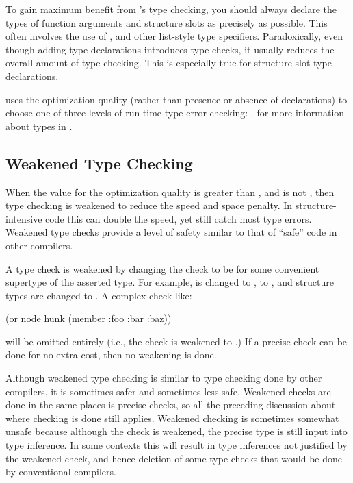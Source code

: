 To gain maximum benefit from \python{}'s type checking, you should
always declare the types of function arguments and structure slots as
precisely as possible.  This often involves the use of ,
 and other list-style type specifiers.  Paradoxically,
even though adding type declarations introduces type checks, it
usually reduces the overall amount of type checking.  This is
especially true for structure slot type declarations.

\python{} uses the  optimization quality (rather than
presence or absence of declarations) to choose one of three levels of
run-time type error checking: .
 for more information about types in
\python{}.


\subsection{Weakened Type Checking}
\label{weakened-type-checks}

When the value for the  optimization quality is greater
than , and  is not , then type
checking is weakened to reduce the speed and space penalty.  In
structure-intensive code this can double the speed, yet still catch
most type errors.  Weakened type checks provide a level of safety
similar to that of ``safe'' code in other \llisp{} compilers.

A type check is weakened by changing the check to be for some
convenient supertype of the asserted type.  For example,
 is changed to ,
 to , and structure
types are changed to .  A complex check like:
\begin{example}
(or node hunk (member :foo :bar :baz))
\end{example}
will be omitted entirely (i.e., the check is weakened to \code{*}.)  If
a precise check can be done for no extra cost, then no weakening is
done.

Although weakened type checking is similar to type checking done by
other compilers, it is sometimes safer and sometimes less safe.
Weakened checks are done in the same places is precise checks, so all
the preceding discussion about where checking is done still applies.
Weakened checking is sometimes somewhat unsafe because although the
check is weakened, the precise type is still input into type
inference.  In some contexts this will result in type inferences not
justified by the weakened check, and hence deletion of some type
checks that would be done by conventional compilers.


